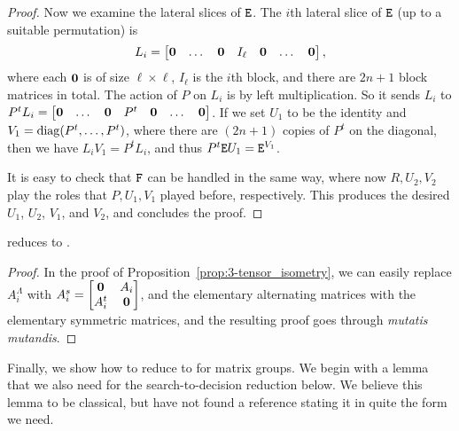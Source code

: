 \documentclass[11pt]{article}
\begin{document}
\begin{proof}
Now we examine the lateral slices of $\mathtt{E}$. 
The $i$th lateral 
slice of $\mathtt{E}$ 
(up to a suitable permutation)
is 
$$L_i=\begin{bmatrix}\mathbf{0} & \dots & \mathbf{0} & I_{\ell} & \mathbf{0} & \dots & 
\mathbf{0}\end{bmatrix},$$ where each $\mathbf{0}$ is of size $\ell\times \ell$, 
$I_{\ell}$ is the 
$i$th block, and there are $2n+1$ block matrices in total. The action of $P$ on 
$L_i$ is by left multiplication. So it sends 
$L_i$ to $P^t L_i = \begin{bmatrix}\mathbf{0} & \dots & \mathbf{0} & P^t & \mathbf{0} & \dots & 
\mathbf{0}\end{bmatrix}$. 
If we set $U_1$ to be the identity and $V_1 = \operatorname{diag}(P^t, \dotsc, P^t)$, where there are $(2n+1)$ copies of $P^t$ on the diagonal, then we have $L_i V_1 = P^t L_i$, and thus $P^t\mathtt{E} 
U_1=\mathtt{E}^{V_1}$. 

It is easy to check that $\mathtt{F}$ can be handled in the same way, where now $R, U_2, V_2$ play the roles that $P, U_1, V_1$ played before, respectively. This produces the 
desired $U_1$, $U_2$, $V_1$, and $V_2$, and concludes the proof. 
\end{proof}

\begin{corollary} \label{cor:AltSymMatSpIsom}
\ThreeTIlong reduces to \SymMatSpIsomlong.
\end{corollary}

\begin{proof}
In the proof of Proposition~\ref{prop:3-tensor_isometry}, we can easily replace $A_i^{\Lambda}$ with $A_i^s = \begin{bmatrix}\mathbf{0} & A_i \\ A_i^t & \mathbf{0}  \end{bmatrix}$, and the elementary alternating matrices with the elementary symmetric matrices, and the resulting proof goes through \emph{mutatis mutandis}. 
\end{proof}

Finally, we show how to reduce to \GpIlong for matrix groups. We begin with a lemma that we also need for the search-to-decision reduction below. We believe this lemma to be classical, but have not found a reference stating it in quite the form we need.
\end{document}
